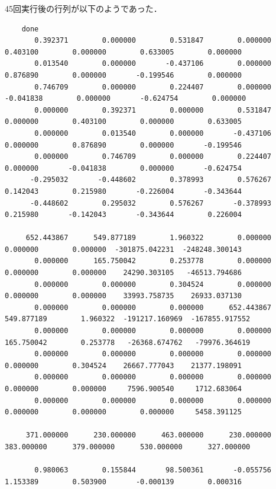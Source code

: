 \documentclass[11pt]{jarticle}
\begin{document}
\normalsize

45回実行後の行列が以下のようであった．
\tiny
\begin{verbatim}
    done
       0.392371        0.000000        0.531847        0.000000        0.403100        0.000000        0.633005        0.000000 
       0.013540        0.000000       -0.437106        0.000000        0.876890        0.000000       -0.199546        0.000000 
       0.746709        0.000000        0.224407        0.000000       -0.041838        0.000000       -0.624754        0.000000 
       0.000000        0.392371        0.000000        0.531847        0.000000        0.403100        0.000000        0.633005 
       0.000000        0.013540        0.000000       -0.437106        0.000000        0.876890        0.000000       -0.199546 
       0.000000        0.746709        0.000000        0.224407        0.000000       -0.041838        0.000000       -0.624754 
      -0.295032       -0.448602        0.378993        0.576267        0.142043        0.215980       -0.226004       -0.343644 
      -0.448602        0.295032        0.576267       -0.378993        0.215980       -0.142043       -0.343644        0.226004 

     652.443867      549.877189        1.960322        0.000000        0.000000        0.000000  -301875.042231  -248248.300143 
       0.000000      165.750042        0.253778        0.000000        0.000000        0.000000    24290.303105   -46513.794686 
       0.000000        0.000000        0.304524        0.000000        0.000000        0.000000    33993.758735    26933.037130 
       0.000000        0.000000        0.000000      652.443867      549.877189        1.960322  -191217.160969  -167855.917552 
       0.000000        0.000000        0.000000        0.000000      165.750042        0.253778   -26368.674762   -79976.364619 
       0.000000        0.000000        0.000000        0.000000        0.000000        0.304524    26667.777043    21377.198091 
       0.000000        0.000000        0.000000        0.000000        0.000000        0.000000     7596.900540     1712.683064 
       0.000000        0.000000        0.000000        0.000000        0.000000        0.000000        0.000000     5458.391125 

     371.000000      230.000000      463.000000      230.000000      383.000000      379.000000      530.000000      327.000000 

       0.980063        0.155844       98.500361       -0.055756        1.153389        0.503900       -0.000139        0.000316 
\end{verbatim}
\normalsize
\end{document}

